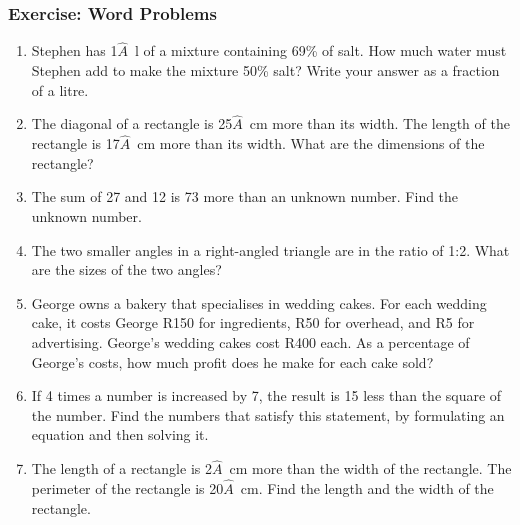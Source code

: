     \noindent
  
\label{m39262*secfhsst!!!underscore!!!id6331}
            \subsubsection{Exercise:  Word Problems }
            \nopagebreak
            
        \label{m39262*id162712}\begin{enumerate}[noitemsep, label=\textbf{\arabic*}. ] 
            \label{m39262*uid112}\item Stephen has 1\ensuremath{\hat{A}}~l of a mixture containing 69\% of salt. How much water must Stephen add to make the mixture 50\% salt? Write your answer as a fraction of a litre.
\hspace{1ex}        
\label{m39262*uid113}\item The diagonal of a rectangle is 25\ensuremath{\hat{A}}~cm more than its width. The length of the rectangle is 17\ensuremath{\hat{A}}~cm more than its width. What are the dimensions of the rectangle?
\hspace{1ex}        
\label{m39262*uid114}\item The sum of 27 and 12 is 73 more than an unknown number. Find the unknown number.
\hspace{1ex}        
\label{m39262*uid115}\item The two smaller angles in a right-angled triangle are in the ratio of 1:2. What are the sizes of the two angles?
\hspace{1ex}        
\label{m39262*uid116}\item George owns a bakery that specialises in wedding cakes. For each wedding cake, it costs George R150 for ingredients, R50 for overhead, and R5 for advertising. George's wedding cakes cost R400 each. As a percentage of George's costs, how much profit does he make for each cake sold?
\hspace{1ex}        
\label{m39262*uid117}\item If 4 times a number is increased by 7, the result is 15 less than the square of the number. Find the numbers that satisfy this statement, by formulating an equation and then solving it.
\hspace{1ex}        
\label{m39262*uid118}\item The length of a rectangle is 2\ensuremath{\hat{A}}~cm more than the width of the rectangle. The perimeter of the rectangle is 20\ensuremath{\hat{A}}~cm. Find the length and the width of the rectangle.
\hspace{1ex}        
\end{enumerate}
        
